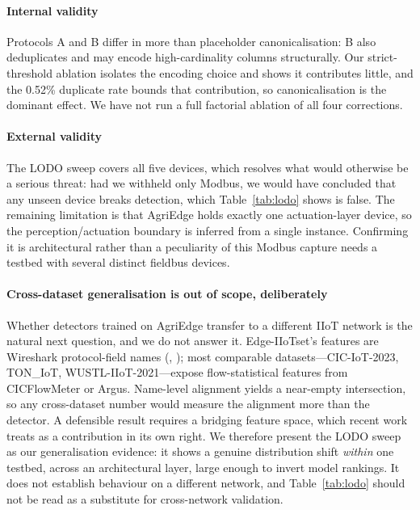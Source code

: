 \paragraph{Internal validity} Protocols A and B differ in more than placeholder
canonicalisation: B also deduplicates and may encode high-cardinality columns
structurally. Our strict-threshold ablation isolates the encoding choice and
shows it contributes little, and the 0.52\% duplicate rate bounds that
contribution, so canonicalisation is the dominant effect. We have not run a
full factorial ablation of all four corrections.

\paragraph{External validity} The LODO sweep covers all five devices, which
resolves what would otherwise be a serious threat: had we withheld only Modbus,
we would have concluded that any unseen device breaks detection, which
Table~\ref{tab:lodo} shows is false. The remaining limitation is that AgriEdge
holds exactly one actuation-layer device, so the perception/actuation boundary
is inferred from a single instance. Confirming it is architectural rather than
a peculiarity of this Modbus capture needs a testbed with several distinct
fieldbus devices.

\paragraph{Cross-dataset generalisation is out of scope, deliberately} Whether
detectors trained on AgriEdge transfer to a different IIoT network is the
natural next question, and we do not answer it. Edge-IIoTset's features are
Wireshark protocol-field names (, ); most
comparable datasets---CIC-IoT-2023, TON\_IoT, WUSTL-IIoT-2021---expose
flow-statistical features from CICFlowMeter or Argus. Name-level alignment
yields a near-empty intersection, so any cross-dataset number would measure the
alignment more than the detector. A defensible result requires a bridging
feature space, which recent work~\cite{bridge2026tchnet} treats as a
contribution in its own right. We therefore present the LODO sweep as our
generalisation evidence: it shows a genuine distribution shift \emph{within}
one testbed, across an architectural layer, large enough to invert model
rankings. It does not establish behaviour on a different network, and
Table~\ref{tab:lodo} should not be read as a substitute for cross-network
validation.

